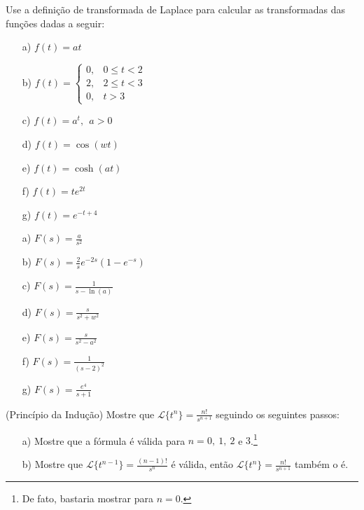 \begin{exer}Use a definição de transformada de Laplace para calcular as transformadas das funções dadas a seguir:
 \begin{itemize}
  \item[a)] $f(t)=at$
  \item[b)] $f(t)=\left\{\begin{array}{ll}0, & 0\leq t< 2\\2,&  2\leq t< 3\\0,&t>3 \end{array}\right.$
  \item[c)] $f(t)=a^t,~~a>0$
  \item[d)] $f(t)=\cos(wt)$ 
  \item[e)] $f(t)=\cosh(at)$ 
  \item[f)] $f(t)=te^{2t}$ 
  \item[g)] $f(t)=e^{-t+4}$ 
 \end{itemize}
\end{exer}
\begin{resp}
 \begin{itemize}
  \item[a)] $F(s)=\frac{a}{s^2}$
  \item[b)] $F(s)=\frac{2}{s}e^{-2s}\left(1-e^{-s}\right)$ 
  \item[c)] $F(s)=\frac{1}{s-\ln(a)}$
  \item[d)] $F(s)=\frac{s}{s^2+w^2}$ 
  \item[e)] $F(s)=\frac{s}{s^2-a^2}$ 
  \item[f)] $F(s)=\frac{1}{(s-2)^2}$ 
  \item[g)] $F(s)=\frac{e^{4}}{s+1}$ 
  \end{itemize}
\end{resp}
 \begin{exer}\label{inducao_tn}(Princípio da Indução) Mostre que $\displaystyle\mathcal{L}\{t^n\}=\frac{n!}{s^{n+1}}$ seguindo os seguintes passos:
 \begin{itemize}
  \item[a)] Mostre que a fórmula é válida para $n=0,\ 1,\ 2$ e $3$.\footnote{De fato, bastaria mostrar para $n=0$.}
  \item[b)] Mostre que $\displaystyle\mathcal{L}\{t^{n-1}\}=\frac{(n-1)!}{s^{n}}$ é válida, então $\displaystyle\mathcal{L}\{t^n\}=\frac{n!}{s^{n+1}}$ também o é.
 \end{itemize}
 \end{exer}

